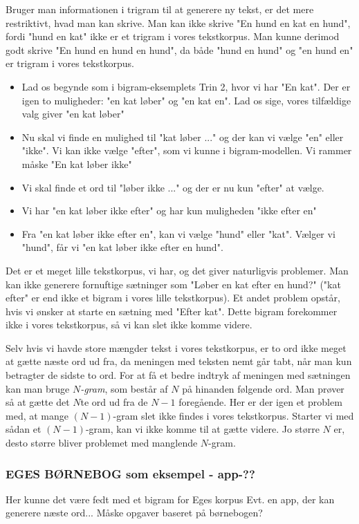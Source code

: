 \documentclass{article}
\newcommand{\am}[1]{{\color{red} #1}}
\begin{document}
Bruger man informationen i trigram til at generere ny tekst, er det mere restriktivt, hvad man kan skrive. Man kan ikke skrive "En hund en kat en hund", fordi "hund en kat" ikke er et trigram i vores tekstkorpus.  Man kunne derimod godt skrive "En hund en hund en hund", da både "hund en hund" og "en hund en" er trigram i vores tekstkorpus. 
\begin{itemize}
    \item Lad os begynde som i bigram-eksemplets Trin 2, hvor vi har "En kat". Der er igen to muligheder: "en kat løber" og "en kat en". Lad os sige, vores tilfældige valg giver "en kat løber"
    \item Nu skal vi finde en mulighed til "kat løber ..." og der kan vi vælge "en" eller "ikke". Vi kan ikke vælge "efter", som vi kunne i bigram-modellen. Vi rammer måske "En kat løber ikke"
    \item Vi skal finde et ord til "løber ikke ..." og der er nu kun "efter" at vælge.
    \item Vi har "en kat løber ikke efter" og har kun muligheden "ikke efter en"
    \item Fra "en kat løber ikke efter en", kan vi vælge "hund" eller "kat". Vælger vi "hund", får vi "en kat løber ikke efter en hund". 
\end{itemize}
Det er et meget lille tekstkorpus, vi har, og det giver naturligvis problemer. Man kan ikke generere fornuftige sætninger som "Løber en kat efter en hund?" ("kat efter" er end ikke et bigram i vores lille tekstkorpus). Et andet problem opstår, hvis vi ønsker at starte en sætning med "Efter kat". Dette bigram forekommer ikke i vores tekstkorpus, så vi kan slet ikke komme videre. 

Selv hvis vi havde store mængder tekst i vores tekstkorpus, er to ord ikke meget at gætte næste ord ud fra, da meningen med teksten nemt går tabt, når man kun betragter de sidste to ord. For at få et bedre indtryk af meningen med sætningen kan man bruge \emph{$N$-gram}, som består af $N$ på hinanden følgende ord. Man prøver så at gætte det $N$te ord ud fra de $N-1$ foregående. Her er der igen et problem med, at mange $(N-1)$-gram slet ikke findes i vores tekstkorpus. Starter vi med sådan et $(N-1)$-gram, kan vi  ikke komme til at gætte videre. Jo større $N$ er, desto større bliver problemet med manglende $N$-gram.

\am{\subsubsection*{EGES BØRNEBOG som eksempel - app-??}

Her kunne det være fedt med et bigram for Eges korpus
Evt. en app, der kan generere næste ord...
Måske opgaver baseret på børnebogen? }
\end{document}
